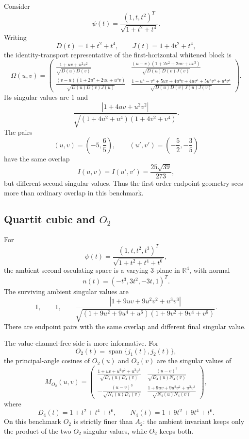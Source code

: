 \documentclass[11pt]{amsart}
\newcommand{\R}{\mathbb R}
\newcommand{\Span}{\operatorname{span}}
\begin{document}
Consider
\[
        \psi(t)=\frac{(1,t,t^2)^T}{\sqrt{1+t^2+t^4}}.
\]
Writing
\[
        D(t)=1+t^2+t^4,\qquad J(t)=1+4t^2+t^4,
\]
the identity-transport representative of the first-horizontal whitened block is
\[
\Omega(u,v)=
\begin{pmatrix}
\frac{1+uv+u^2v^2}{\sqrt{D(u)D(v)}} &
\frac{(u-v)(1+2v^2+2uv+uv^3)}{\sqrt{D(u)D(v)J(v)}}\\[1.2ex]
\frac{(v-u)(1+2u^2+2uv+u^3v)}{\sqrt{D(u)D(v)J(u)}} &
\frac{1-u^4-v^4+5uv+4u^3v+4uv^3+5u^3v^3+u^4v^4}
{\sqrt{D(u)D(v)J(u)J(v)}}
\end{pmatrix}.
\]
Its singular values are \(1\) and
\[
        \frac{|1+4uv+u^2v^2|}
        {\sqrt{(1+4u^2+u^4)(1+4v^2+v^4)}}.
\]
The pairs
\[
        (u,v)=\left(-5,\frac65\right),
        \qquad
        (u',v')=\left(-\frac52,-\frac35\right)
\]
have the same overlap
\[
        I(u,v)=I(u',v')=\frac{25\sqrt{39}}{273},
\]
but different second singular values. Thus the first-order endpoint geometry
sees more than ordinary overlap in this benchmark.

\subsection{\texorpdfstring{Quartit cubic and \(O_2\)}{Quartit cubic and O2}}

For
\[
        \psi(t)=\frac{(1,t,t^2,t^3)^T}
        {\sqrt{1+t^2+t^4+t^6}},
\]
the ambient second osculating space is a varying \(3\)-plane in \(\R^4\), with
normal
\[
        n(t)=(-t^3,3t^2,-3t,1)^T.
\]
The surviving ambient singular values are
\[
        1,\qquad 1,\qquad
        \frac{|1+9uv+9u^2v^2+u^3v^3|}
        {\sqrt{(1+9u^2+9u^4+u^6)(1+9v^2+9v^4+v^6)}}.
\]
There are endpoint pairs with the same overlap and different final singular
value.

The value-channel-free side is more informative. For
\[
        O_2(t)=\Span\{j_1(t),j_2(t)\},
\]
the principal-angle cosines of \(O_2(u)\) and \(O_2(v)\) are the singular
values of
\[
M_{O_2}(u,v)=
\begin{pmatrix}
\frac{1+uv+u^2v^2+u^3v^3}{\sqrt{D_4(u)D_4(v)}} &
\frac{(u-v)^3}{\sqrt{D_4(u)N_4(v)}}\\[1.2ex]
-\frac{(u-v)^3}{\sqrt{N_4(u)D_4(v)}} &
\frac{1+9uv+9u^2v^2+u^3v^3}{\sqrt{N_4(u)N_4(v)}}
\end{pmatrix},
\]
where
\[
        D_4(t)=1+t^2+t^4+t^6,\qquad
        N_4(t)=1+9t^2+9t^4+t^6.
\]
On this benchmark \(O_2\) is strictly finer than \(A_2\): the ambient invariant
keeps only the product of the two \(O_2\) singular values, while \(O_2\) keeps
both.
\end{document}
